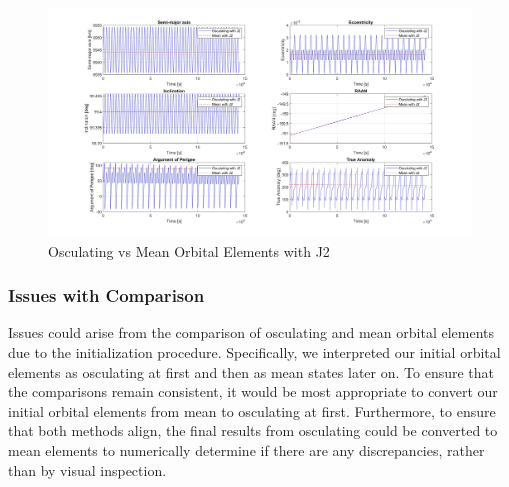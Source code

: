 \begin{figure}[H]
    \centering
    \includegraphics[width=1.1\linewidth]{PS1/Figures/OE_mean_osc_J2_comparison.jpg}
    \caption{Osculating vs Mean Orbital Elements with J2}
    \label{fig:osc_mean_oe}
\end{figure}

\subsubsection{Issues with Comparison}
Issues could arise from the comparison of osculating and mean orbital elements due to the initialization procedure. Specifically, we interpreted our initial orbital elements as osculating at first and then as mean states later on. To ensure that the comparisons remain consistent, it would be most appropriate to convert our initial orbital elements from mean to osculating at first. Furthermore, to ensure that both methods align, the final results from osculating could be converted to mean elements to numerically determine if there are any discrepancies, rather than by visual inspection.
